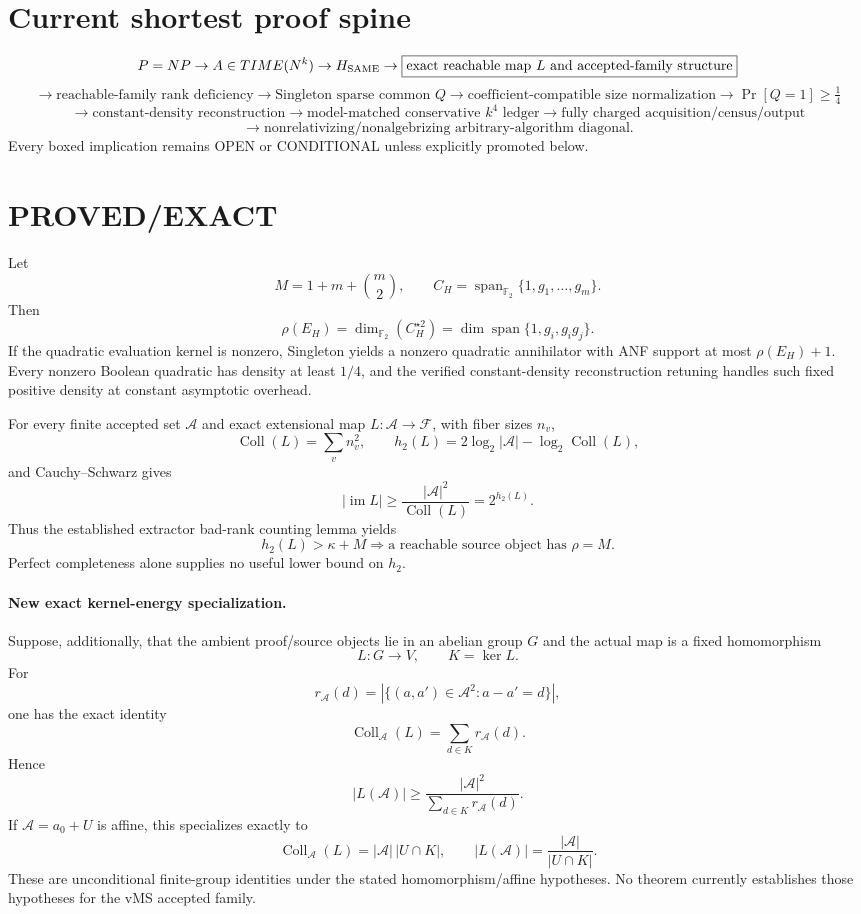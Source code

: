 \documentclass[11pt]{article}
\begin{document}
\section*{Current shortest proof spine}
\[
P=NP\to A\in TIME(N^k)\to H_{\rm SAME}
\to \boxed{\text{exact reachable map }L\text{ and accepted-family structure}}
\]
\[
\to \boxed{\text{reachable-family rank deficiency}}
\to \text{Singleton sparse common }Q
\to \boxed{\text{coefficient-compatible size normalization}}
\to \Pr[Q=1]\ge\tfrac14
\]
\[
\to \text{constant-density reconstruction}
\to \boxed{\text{model-matched conservative }k^4\text{ ledger}}
\to \boxed{\text{fully charged acquisition/census/output}}
\]
\[
\to \boxed{\text{nonrelativizing/nonalgebrizing arbitrary-algorithm diagonal}}.
\]
Every boxed implication remains OPEN or CONDITIONAL unless explicitly promoted below.

\section*{PROVED/EXACT}
Let
\[
M=1+m+\binom m2,\qquad
C_H=\operatorname{span}_{\mathbb F_2}\{1,g_1,\ldots,g_m\}.
\]
Then
\[
\rho(E_H)=\dim_{\mathbb F_2}(C_H^{\star2})
=\dim\operatorname{span}\{1,g_i,g_i g_j\}.
\]
If the quadratic evaluation kernel is nonzero, Singleton yields a nonzero quadratic annihilator with ANF support at most \(\rho(E_H)+1\). Every nonzero Boolean quadratic has density at least \(1/4\), and the verified constant-density reconstruction retuning handles such fixed positive density at constant asymptotic overhead.

For every finite accepted set \(\mathcal A\) and exact extensional map \(L:\mathcal A\to\mathcal F\), with fiber sizes \(n_v\),
\[
\operatorname{Coll}(L)=\sum_v n_v^2,
\qquad
h_2(L)=2\log_2|\mathcal A|-\log_2\operatorname{Coll}(L),
\]
and Cauchy--Schwarz gives
\[
|\operatorname{im}L|\ge
\frac{|\mathcal A|^2}{\operatorname{Coll}(L)}
=2^{h_2(L)}.
\]
Thus the established extractor bad-rank counting lemma yields
\[
h_2(L)>\kappa+M
\Longrightarrow
\text{a reachable source object has }\rho=M.
\]
Perfect completeness alone supplies no useful lower bound on \(h_2\).

\paragraph{New exact kernel-energy specialization.}
Suppose, additionally, that the ambient proof/source objects lie in an abelian group \(G\) and the actual map is a fixed homomorphism
\[
L:G\to V,\qquad K=\ker L.
\]
For
\[
r_{\mathcal A}(d)
=
|\{(a,a')\in\mathcal A^2:a-a'=d\}|,
\]
one has the exact identity
\[
\boxed{
\operatorname{Coll}_{\mathcal A}(L)
=
\sum_{d\in K}r_{\mathcal A}(d)
}.
\]
Hence
\[
\boxed{
|L(\mathcal A)|
\ge
\frac{|\mathcal A|^2}
{\sum_{d\in K}r_{\mathcal A}(d)}
}.
\]
If \(\mathcal A=a_0+U\) is affine, this specializes exactly to
\[
\operatorname{Coll}_{\mathcal A}(L)=|\mathcal A|\,|U\cap K|,
\qquad
|L(\mathcal A)|=\frac{|\mathcal A|}{|U\cap K|}.
\]
These are unconditional finite-group identities under the stated homomorphism/affine hypotheses. No theorem currently establishes those hypotheses for the vMS accepted family.
\end{document}

